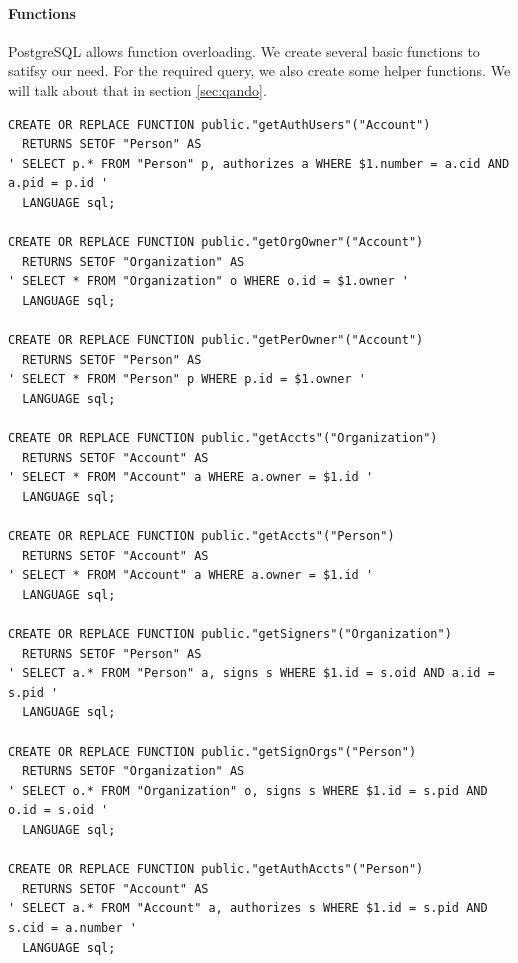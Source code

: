 \documentclass[11pt]{article}
\begin{document}
\paragraph{Functions} PostgreSQL allows function overloading. We create several basic functions to satifsy our need. For the required query, we also create some helper functions. We will talk about that in section \ref{sec:qando}.
\label{sec:functions}
\begin{verbatim}
CREATE OR REPLACE FUNCTION public."getAuthUsers"("Account")
  RETURNS SETOF "Person" AS
' SELECT p.* FROM "Person" p, authorizes a WHERE $1.number = a.cid AND a.pid = p.id '
  LANGUAGE sql;

CREATE OR REPLACE FUNCTION public."getOrgOwner"("Account")
  RETURNS SETOF "Organization" AS
' SELECT * FROM "Organization" o WHERE o.id = $1.owner '
  LANGUAGE sql;

CREATE OR REPLACE FUNCTION public."getPerOwner"("Account")
  RETURNS SETOF "Person" AS
' SELECT * FROM "Person" p WHERE p.id = $1.owner '
  LANGUAGE sql;

CREATE OR REPLACE FUNCTION public."getAccts"("Organization")
  RETURNS SETOF "Account" AS
' SELECT * FROM "Account" a WHERE a.owner = $1.id '
  LANGUAGE sql;

CREATE OR REPLACE FUNCTION public."getAccts"("Person")
  RETURNS SETOF "Account" AS
' SELECT * FROM "Account" a WHERE a.owner = $1.id '
  LANGUAGE sql;

CREATE OR REPLACE FUNCTION public."getSigners"("Organization")
  RETURNS SETOF "Person" AS
' SELECT a.* FROM "Person" a, signs s WHERE $1.id = s.oid AND a.id = s.pid '
  LANGUAGE sql;

CREATE OR REPLACE FUNCTION public."getSignOrgs"("Person")
  RETURNS SETOF "Organization" AS
' SELECT o.* FROM "Organization" o, signs s WHERE $1.id = s.pid AND o.id = s.oid '
  LANGUAGE sql;

CREATE OR REPLACE FUNCTION public."getAuthAccts"("Person")
  RETURNS SETOF "Account" AS
' SELECT a.* FROM "Account" a, authorizes s WHERE $1.id = s.pid AND s.cid = a.number '
  LANGUAGE sql;
\end{verbatim}
\end{document}
